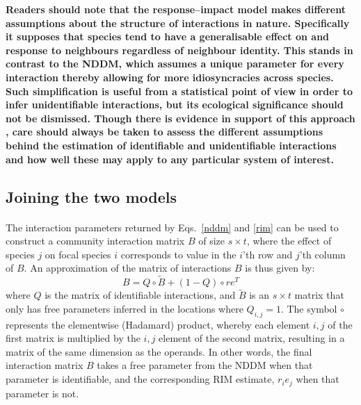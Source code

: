 \documentclass[a4,12pt]{article}
\begin{document}
\begin{refsection}
    \textbf{Readers should note that the response--impact model makes different assumptions about the structure of interactions in nature. Specifically it supposes that species tend to have a generalisable effect on and response to neighbours regardless of neighbour identity. This stands in contrast to the NDDM, which assumes a unique parameter for every interaction thereby allowing for more idiosyncracies across species. Such simplification is useful from a statistical point of view in order to infer unidentifiable interactions, but its ecological significance should not be dismissed. Though there is evidence in support of this approach \parencite{Stouffer2022, Skwara2022}, care should always be taken to assess the different assumptions behind the estimation of identifiable and unidentifiable interactions and how well these may apply to any particular system of interest.}


    \subsection{Joining the two models}
    \label{meth:addlog}

    \paragraph{}
    The interaction parameters returned by Eqs.~\ref{nddm} and \ref{rim} can be used to construct a community interaction matrix $B$ of size $s \times t$, where the effect of species $j$ on focal species $i$ corresponds to value in the $i$'th row and $j$'th column of $B$. An approximation of the matrix of interactions $B$ is thus given by:
        \begin{equation}
        B = Q \circ \tilde B + (1 - Q) \circ r e^T
        \label{matB}
        \end{equation}
    where $Q$ is the matrix of identifiable interactions, and $\tilde B$ is an $s \times t$ matrix that only has free parameters inferred in the locations where $Q_{i, j} =1$. The symbol $\circ$ represents the elementwise (Hadamard) product, whereby each element $i, j$ of the first matrix is multiplied by the $i, j$ element of the second matrix, resulting in a matrix of the same dimension as the operands. In other words, the final interaction matrix $B$ takes a free parameter from the NDDM when that parameter is identifiable, and the corresponding RIM estimate, $r_i e_j$ when that parameter is not.


\end{refsection}
\end{document}
